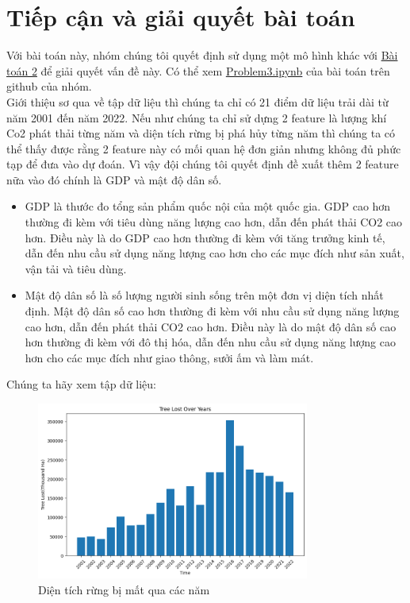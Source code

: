 \documentclass[a4paper,12pt]{report}
\begin{document}
\section{Tiếp cận và giải quyết bài toán} %
\label{sec:tiếp_cận_bài_toán}
\begin{flushleft}
	Với bài toán này, nhóm chúng tôi quyết định sử dụng một mô hình khác với \textcolor{blue}{\hyperlink{chapter.2}{Bài toán 2}} để giải quyết vấn đề này. Có thể xem \textcolor{blue}{\underline{\href{https://github.com/XuananLe/MathModelingContest/blob/main/APM_TMH_V2/Problem3.ipynb}{Problem3.ipynb}}} của bài toán trên github của nhóm.
	\\[\baselineskip]

	Giới thiệu sơ qua về tập dữ liệu thì chúng ta chỉ có 21 điểm dữ liệu trải dài từ năm 2001 đến năm 2022. Nếu như chúng ta chỉ sử dựng 2 feature là lượng khí Co2 phát thải từng năm và diện tích rừng bị phá hủy từng năm thì chúng ta có thể thấy được rằng 2 feature này có mối quan hệ đơn giản nhưng không đủ phức tạp để đưa vào dự đoán. Vì vậy đội chúng tôi quyết định đề xuất thêm 2 feature nữa vào đó chính là GDP và mật độ dân số.
	\begin{itemize}
		\item GDP là thước đo tổng sản phẩm quốc nội của một quốc gia. GDP cao hơn thường đi kèm với tiêu dùng năng lượng cao hơn, dẫn đến phát thải CO2 cao hơn. Điều này là do GDP cao hơn thường đi kèm với tăng trưởng kinh tế, dẫn đến nhu cầu sử dụng năng lượng cao hơn cho các mục đích như sản xuất, vận tải và tiêu dùng.

		\item Mật độ dân số là số lượng người sinh sống trên một đơn vị diện tích nhất định. Mật độ dân số cao hơn thường đi kèm với nhu cầu sử dụng năng lượng cao hơn, dẫn đến phát thải CO2 cao hơn. Điều này là do mật độ dân số cao hơn thường đi kèm với đô thị hóa, dẫn đến nhu cầu sử dụng năng lượng cao hơn cho các mục đích như giao thông, sưởi ấm và làm mát.
	\end{itemize}

	Chúng ta hãy xem tập dữ liệu:
	\begin{figure}[H]
		\centering
		\includegraphics[width = 0.8\textwidth]{images/tree_loss_problem3.png}
		\caption{Diện tích rừng bị mất qua các năm}
	\end{figure}


\end{flushleft}
\end{document}
